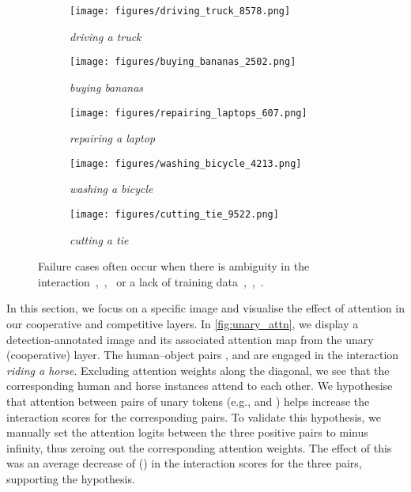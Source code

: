 \documentclass[10pt,twocolumn,letterpaper]{article}
\begin{document}
\begin{figure*}[t]
    \centering
    
    \begin{subfigure}[t]{0.19\linewidth}
    \centering
    \texttt{[image: figures/driving\_truck\_8578.png]}
    \caption{\textit{driving a truck}}
    \label{fig:driving-truck}
    \end{subfigure} \hfill
\begin{subfigure}[t]{0.19\linewidth}
    \texttt{[image: figures/buying\_bananas\_2502.png]}
    \caption{\textit{buying bananas}}
    \label{fig:buying-bananas}
\end{subfigure} \hfill
    \begin{subfigure}[t]{0.19\linewidth}
    \centering
    \texttt{[image: figures/repairing\_laptops\_607.png]}
    \caption{\textit{repairing a laptop}}
    \label{fig:repairing-laptop}
    \end{subfigure} \hfill
    \begin{subfigure}[t]{0.19\linewidth}
    \centering
    \texttt{[image: figures/washing\_bicycle\_4213.png]}
    \caption{\textit{washing a bicycle}}
    \label{fig:washing-bike}
    \end{subfigure} \hfill
    \begin{subfigure}[t]{0.19\linewidth}
    \centering
    \texttt{[image: figures/cutting\_tie\_9522.png]}
    \caption{\textit{cutting a tie}}
    \label{fig:cutting-tie}
    \end{subfigure}

    \caption{Failure cases often occur when there is ambiguity in the interaction~,~,~ or a lack of training data~,~,~.}
    \label{fig:failure}
\end{figure*}

In this section, we focus on a specific image and visualise the effect of attention in our cooperative and competitive layers. In \cref{fig:unary_attn}, we display a detection-annotated image and its associated attention map from the unary (cooperative) layer. The human--object pairs ,  and  are engaged in the interaction \textit{riding a horse}. Excluding attention weights along the diagonal, we see that the corresponding human and horse instances attend to each other.
We hypothesise that attention between pairs of unary tokens (e.g.,  and ) helps increase the interaction scores for the corresponding pairs. To validate this hypothesis, we manually set the attention logits between the three positive pairs to minus infinity, thus zeroing out the corresponding attention weights. The effect of this was an average decrease of  () in the interaction scores for the three pairs, supporting the hypothesis.
\end{document}
